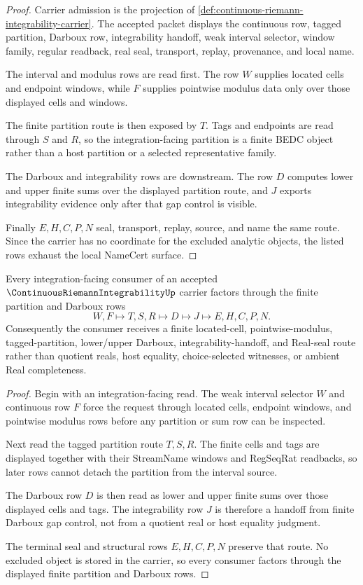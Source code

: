 \begin{proof}
Carrier admission is the projection of \autoref{def:continuous-riemann-integrability-carrier}. The accepted packet displays the continuous row, tagged partition, Darboux row, integrability handoff, weak interval selector, window family, regular readback, real seal, transport, replay, provenance, and local name.

The interval and modulus rows are read first. The row $W$ supplies located cells and endpoint windows, while $F$ supplies pointwise modulus data only over those displayed cells and windows.

The finite partition route is then exposed by $T$. Tags and endpoints are read through $S$ and $R$, so the integration-facing partition is a finite BEDC object rather than a host partition or a selected representative family.

The Darboux and integrability rows are downstream. The row $D$ computes lower and upper finite sums over the displayed partition route, and $J$ exports integrability evidence only after that gap control is visible.

Finally $E,H,C,P,N$ seal, transport, replay, source, and name the same route. Since the carrier has no coordinate for the excluded analytic objects, the listed rows exhaust the local NameCert surface.
\end{proof}

\begin{theorem}
\label{thm:continuous-riemann-integrability-darboux-handoff}
Every integration-facing consumer of an accepted $\ContinuousRiemannIntegrabilityUp$ carrier factors through the finite partition and Darboux rows
$$
W,F \longmapsto T,S,R \longmapsto D \longmapsto J \longmapsto E,H,C,P,N .
$$
Consequently the consumer receives a finite located-cell, pointwise-modulus, tagged-partition, lower/upper Darboux, integrability-handoff, and Real-seal route rather than quotient reals, host equality, choice-selected witnesses, or ambient Real completeness.
\end{theorem}
\begin{proof}
Begin with an integration-facing read. The weak interval selector $W$ and continuous row $F$ force the request through located cells, endpoint windows, and pointwise modulus rows before any partition or sum row can be inspected.

Next read the tagged partition route $T,S,R$. The finite cells and tags are displayed together with their StreamName windows and RegSeqRat readbacks, so later rows cannot detach the partition from the interval source.

The Darboux row $D$ is then read as lower and upper finite sums over those displayed cells and tags. The integrability row $J$ is therefore a handoff from finite Darboux gap control, not from a quotient real or host equality judgment.

The terminal seal and structural rows $E,H,C,P,N$ preserve that route. No excluded object is stored in the carrier, so every consumer factors through the displayed finite partition and Darboux rows.
\end{proof}

